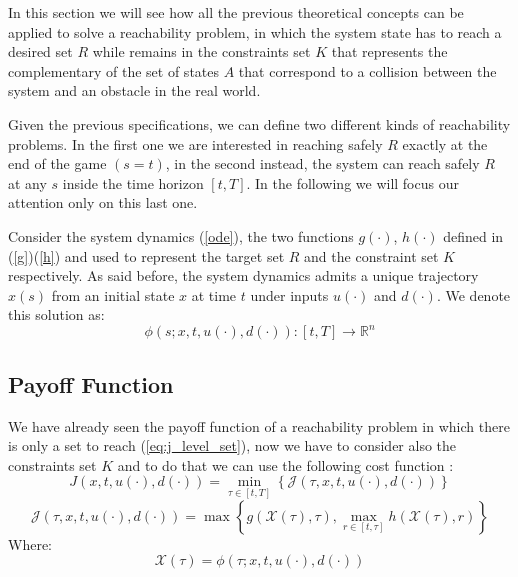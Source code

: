 In this section we will see how all the previous theoretical concepts can be applied to solve a reachability problem, in which the system state has to reach a desired set $R$ while remains in the constraints set $K$ that represents the complementary of the set of states $A$ that correspond to a collision between the system and an obstacle in the real world.

Given the previous specifications, we can define two different kinds of reachability problems. In the first one we are interested in reaching safely $R$ exactly at the end of the game $(s=t)$, in the second instead, the system can reach safely $R$ at any $s$ inside the time horizon $[t, T]$. In the following we will focus our attention only on this last one.

Consider the system dynamics (\ref{ode}), the two functions $g(\cdot)$, $h(\cdot)$ defined in (\ref{g})(\ref{h}) and used to represent the target set $R$ and the constraint set $K$ respectively. As said before, the system dynamics admits a unique trajectory $x(s)$ from an initial state $x$ at time $t$ under inputs $u(\cdot)$ and $d(\cdot)$. We denote this solution as:
\[
    \phi(s; x, t, u(\cdot), d(\cdot)) : [t, T] \rightarrow \mathbb{R}^n
\]

\subsection{Payoff Function}
We have already seen the payoff function of a reachability problem in which there is only a set to reach (\ref{eq:j_level_set}), now we have to consider also the constraints set $K$ and to do that we can use the following cost function \cite{new_paper}:
\begin{equation}
    \label{j_ras}
    J(x, t, u(\cdot), d(\cdot)) =  
        \min_{\tau \in [t, T]}
        \left\{
            \mathcal{J}(\tau, x, t, u(\cdot), d(\cdot))
        \right\}
\end{equation}
\begin{equation}
    \label{jj_ras}
    \mathcal{J}(\tau, x, t, u(\cdot), d(\cdot)) =  
        \max
        \left\{
            g(\mathcal{X}(\tau), \tau), \max_{r \in [t, \tau]}h(\mathcal{X}(\tau), r)            
        \right\}
\end{equation}
Where: 
\[\mathcal{X}(\tau)=\phi(\tau; x, t, u(\cdot), d(\cdot))\]

